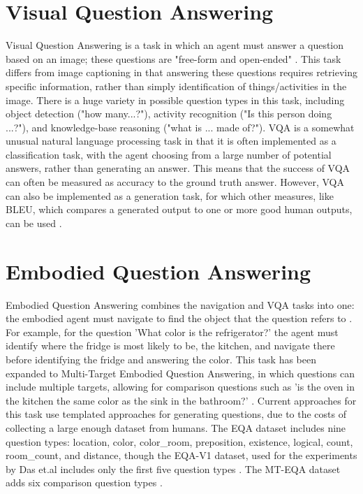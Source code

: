 \section{Visual Question Answering}
Visual Question Answering is a task in which an agent must answer a question based on an image; these questions are "free-form and open-ended" \cite{vqa_2015}. This task differs from image captioning in that answering these questions requires retrieving specific information, rather than simply identification %
of things/activities in the image. There is a huge variety in possible question types in this task, including object detection ("how many...?"), activity recognition ("Is this person doing ...?"), and knowledge-base reasoning ("what is ... made of?"). %
VQA is  a somewhat unusual natural language processing task in that it is often implemented as a classification task, with the agent choosing from a large number of potential answers, rather than generating an answer. %
This means that the success of VQA can often be measured as accuracy to the ground truth answer. However, VQA can also be implemented as a generation task, for which other measures, like BLEU, which compares a generated output to one or more good human outputs, can be used \cite{vqa_survey}\cite{bleu}.

\section{Embodied Question Answering}
Embodied Question Answering combines the navigation and VQA tasks into one: the embodied agent must navigate to find the object that the question refers to \cite{embodiedqa}. For example, for the question 'What color is the refrigerator?' the agent must identify where the fridge is most likely to be, the kitchen, and navigate there before identifying the fridge and answering the color. This task has been expanded to Multi-Target Embodied Question Answering, in which questions can include multiple targets, allowing for comparison questions such as 'is the oven in the kitchen the same color as the sink in the bathroom?' \cite{eqa_multitarget}. Current approaches for this task use templated approaches for generating questions, due to the costs of collecting a large enough dataset from humans.  %
The EQA dataset includes nine question types: location, color, color\_room, preposition, existence, logical, count, room\_count, and distance, though the EQA-V1 dataset, used for the experiments by Das et.al includes only the first five question types \cite{embodiedqa}. The MT-EQA dataset adds six comparison question types \cite{eqa_multitarget}.

